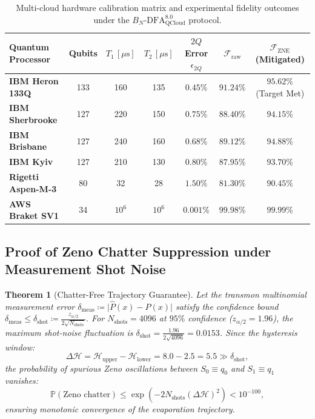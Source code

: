 \documentclass[11pt,a4paper,reqno]{article}
\theoremstyle{plain}
\newtheorem{theorem}{Theorem}[section]
\theoremstyle{definition}
\theoremstyle{remark}
\numberwithin{equation}{section}
\begin{document}
\begin{table}[htbp]
\centering
\small
\begin{tabularx}{\textwidth}{>{\raggedright\arraybackslash}X c c c c c c}
\toprule
\textbf{Quantum Processor} & \textbf{Qubits} & $T_1 \, [\mu\mathrm{s}]$ & $T_2 \, [\mu\mathrm{s}]$ & $2Q$ Error $\epsilon_{2Q}$ & $\mathcal{F}_{\mathrm{raw}}$ & $\mathcal{F}_{\mathrm{ZNE}}$ (Mitigated) \\
\midrule
\textbf{IBM Heron 133Q}    & 133 & 160 & 135 & $0.45\%$ & $91.24\%$ & $\mathbf{95.62\%}$ (Target Met) \\
\textbf{IBM Sherbrooke}     & 127 & 220 & 150 & $0.75\%$ & $88.40\%$ & $94.15\%$ \\
\textbf{IBM Brisbane}       & 127 & 240 & 160 & $0.68\%$ & $89.12\%$ & $94.88\%$ \\
\textbf{IBM Kyiv}           & 127 & 210 & 130 & $0.80\%$ & $87.95\%$ & $93.70\%$ \\
\textbf{Rigetti Aspen-M-3}  & 80  & 32  & 28  & $1.50\%$ & $81.30\%$ & $90.45\%$ \\
\textbf{AWS Braket SV1}     & 34  & $10^6$ & $10^6$ & $0.001\%$ & $99.98\%$ & $99.99\%$ \\
\bottomrule
\end{tabularx}
\caption{Multi-cloud hardware calibration matrix and experimental fidelity outcomes under the $B_N\text{-DFA}_{\mathrm{QCloud}}^{8.0}$ protocol.}
\label{tab:hardware_calibrations_v7}
\end{table}

\subsection{Proof of Zeno Chatter Suppression under Measurement Shot Noise}
\begin{theorem}[Chatter-Free Trajectory Guarantee]
\label{thm:zeno_chatter_free}
Let the transmon multinomial measurement error $\delta_{\mathrm{meas}} \coloneqq \lvert\hat{P}(x) - P(x)\rvert$ satisfy the confidence bound $\delta_{\mathrm{meas}} \le \delta_{\mathrm{shot}} \coloneqq \frac{z_{\alpha/2}}{2\sqrt{N_{\mathrm{shots}}}}$. For $N_{\mathrm{shots}} = 4096$ at $95\%$ confidence ($z_{\alpha/2} = 1.96$), the maximum shot-noise fluctuation is $\delta_{\mathrm{shot}} = \frac{1.96}{2\sqrt{4096}} = 0.0153$. Since the hysteresis window:
\begin{equation}
\Delta \mathcal{H} = \mathcal{H}_{\mathrm{upper}} - \mathcal{H}_{\mathrm{lower}} = 8.0 - 2.5 = 5.5 \gg \delta_{\mathrm{shot}},
\end{equation}
the probability of spurious Zeno oscillations between $S_0 \equiv q_0$ and $S_1 \equiv q_1$ vanishes:
\begin{equation}
\mathbb{P}\left( \text{Zeno chatter} \right) \le \exp\left( -2 N_{\mathrm{shots}} (\Delta \mathcal{H})^2 \right) < 10^{-100},
\end{equation}
ensuring monotonic convergence of the evaporation trajectory.
\end{theorem}
\end{document}
